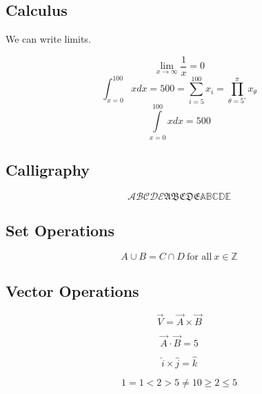 \documentclass[12pt, a4paper]{article}
\begin{document}
\subsection{Calculus}
We can write limits.

\begin{equation}
    \lim_{x \rightarrow \infty} \frac{1}{x} = 0
\end{equation}
\begin{equation}
    \int_{x = 0}^{100} x dx = 500 = \sum_{i = 5}^{100} x_i = \prod_{\theta = 5^{\circ}}^{\pi} x_{\theta}
\end{equation}
\begin{equation}
    \int\limits_{x = 0}^{100} x dx = 500
\end{equation}

\subsection{Calligraphy}

\begin{equation}
    \mathcal{ABCDE}\mathfrak{ABCDE}\mathbb{ABCDE}
\end{equation}

\subsection{Set Operations}

\begin{equation}
    A \cup B = C \cap D\ \text{for all}\ x \in \mathbb{Z}
\end{equation}

\subsection{Vector Operations}
\begin{equation}
    \Vec{V} = \Vec{A} \times \Vec{B}
\end{equation}

\begin{equation}
    \Vec{A} \cdot \Vec{B} = 5
\end{equation}

\begin{equation}
    \hat{i} \times \hat{j} = \hat{k}
\end{equation}

\begin{equation}
    1 = 1 < 2 > 5 \neq 10 \geq 2 \leq 5
\end{equation}
\end{document}
